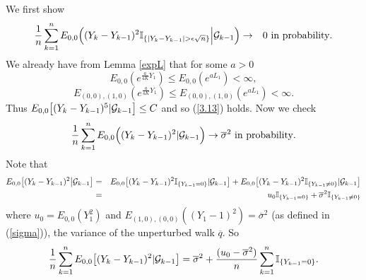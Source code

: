\documentclass[11pt]{amsart}
\begin{document}
We first show
\begin{eqnarray}
\label{3.13}
\frac{1}{n} \sum_{k=1}^{n} E_{0,0}\Big{(}(Y_k-Y_{k-1})^2 \mathbb{I}_{\lbrace|Y_k- Y_{k-1}|>\epsilon \sqrt{n}\rbrace}\Big{\vert} \mathcal{G}_{k-1}\Big{)} &\rightarrow& 0 \mbox{ in probability}.
\end{eqnarray}
We already have from Lemma \ref{expL} that for some $a>0$
\[ E_{0,0}(e^{\frac{a}{4K}Y_1}) \leq E_{0,0}(e^{a L_1}) < \infty ,\]
\[ E_{(0,0),(1,0)}(e^{\frac{a}{4K}Y_1}) \leq E_{(0,0),(1,0)}(e^{a L_1})  < \infty .\]
Thus $E_{0,0}\big{[} (Y_k - Y_{k-1})^5 \vert \mathcal{G}_{k-1} \big{]} \leq C$ and so
(\ref{3.13}) holds. Now we check 
\[ \frac{1}{n} \sum_{k=1}^{n} E_{0,0}\Big{(}(Y_k-Y_{k-1})^2\vert \mathcal{G}_{k-1}\Big{)} \rightarrow \overline{\sigma}^2 \mbox{ in probability}.\]
Note that
\begin{eqnarray*}
 E_{0,0}\big{[}(Y_k-Y_{k-1})^2 \big{\vert} \mathcal{G}_{k-1}\big{]} &=& E_{0,0}\big{[}(Y_k-Y_{k-1})^2 \mathbb{I}_{\{Y_{k-1} = 0\}} \vert \mathcal{G}_{k-1}\big{]} +  E_{0,0}\big{[}(Y_k-Y_{k-1})^2\mathbb{I}_{\{Y_{k-1} \ne 0\}} \vert\mathcal{G}_{k-1}\big{]}\\
 &=& u_0\mathbb{I}_{\{Y_{k-1}=0\}}+\overline{\sigma}^2\mathbb{I}_{\{Y_{k-1}\neq 0\}}
\end{eqnarray*}
where $u_0=E_{0,0}(Y_1^2)$ and $E_{(1,0),(0,0)}((Y_1-1)^2)=\overline{\sigma}^2$ (as defined in (\ref{sigma})), the variance of the unperturbed walk $\overline{q}$. So
\[ \frac{1}{n} \sum_{k=1}^{n} E_{0,0}\big{[}(Y_k-Y_{k-1})^2\vert\mathcal{G}_{k-1}\big{]} = \overline{\sigma}^2 +\frac{(u_0-\overline{\sigma}^2)}{n} \sum_{k=1}^{n} \mathbb{I}_{\{Y_{k-1}=0\}}. \]
 
\end{document}

